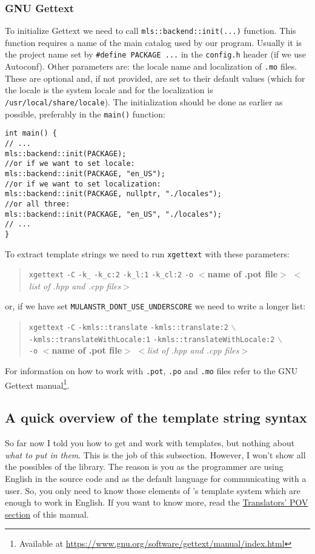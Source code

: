 \subsubsection{GNU Gettext}
To initialize Gettext we need to call \verb+mls::backend::init(...)+ function. 
This function requires a name of the main catalog used by our program. Usually it is the project name set by \verb+#define PACKAGE ...+ in the \texttt{config.h} header (if we use Autoconf).
Other parameters are: the locale name and localization of \texttt{.mo} files. These are optional and, if not provided, are set to their default values (which for the locale is the system locale 
and for the localization is \texttt{/usr/local/share/locale}). The initialization should be done as earlier as possible, preferably in the \verb+main()+ function:
\begin{verbatim}
int main() {
// ...
mls::backend::init(PACKAGE);
//or if we want to set locale:
mls::backend::init(PACKAGE, "en_US");
//or if we want to set localization:
mls::backend::init(PACKAGE, nullptr, "./locales");
//or all three:
mls::backend::init(PACKAGE, "en_US", "./locales");
// ...
}
\end{verbatim}

To extract template strings we need to run \texttt{xgettext} with these parameters: 
\begin{quote}
	\texttt{xgettext} \verb+-C+ \verb+-k_+ \verb+-k_c:2+ \verb+-k_l:1+ \verb+-k_cl:2+ \texttt{-o} $<$\textbf{name of .pot file}$>$ $<$\textit{list of .hpp and .cpp files}$>$
\end{quote}
or, if we have set \verb+MULANSTR_DONT_USE_UNDERSCORE+ we need to write a longer list:
\begin{quote}
	\texttt{xgettext} \verb+-C+ \verb+-kmls::translate+ \verb+-kmls::translate:2+ $\backslash$ \\ \verb+-kmls::translateWithLocale:1+ \verb+-kmls::translateWithLocale:2+ $\backslash$ \\ \texttt{-o} $<$\textbf{name of .pot file}$>$ $<$\textit{list of .hpp and .cpp files}$>$
\end{quote}

For information on how to work with \texttt{.pot}, \texttt{.po} and \texttt{.mo} files refer to the GNU Gettext manual\footnote{Available at \url{https://www.gnu.org/software/gettext/manual/index.html}}.

\subsection{A quick overview of the template string syntax}
So far now I told you how to get and work with templates, but nothing about \emph{what to put in them}. 
This is the job of this subsection. However, I won't show all the possibles of the \mulan{} library.
The reason is you as the programmer are using English in the source code and as the default language for communicating with a user. 
So, you only need to know those elements of \mulan{}'s template system which are enough to work in English. 
If you want to know more, read the \hyperref[transPOV]{Translators' POV section} of this manual. 

